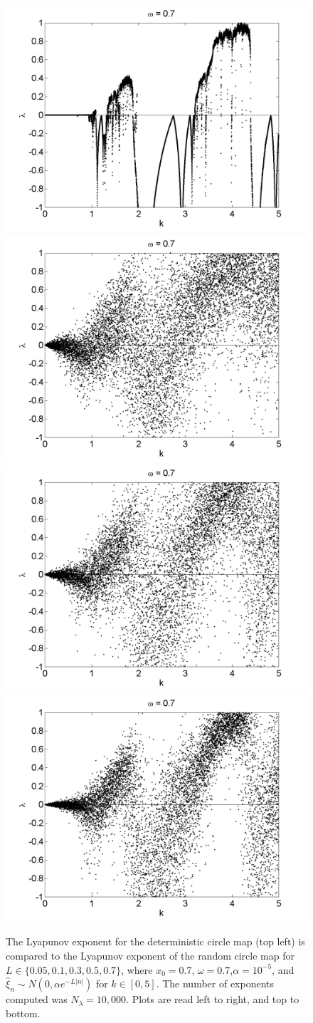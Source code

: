 \begin{figure}[!h]
\caption[Lyapunov exponent in the random circle map (normal distribution) compared to the
deterministic map, varying $k$]{The Lyapunov exponent for the deterministic
  circle map (top left) is compared
  to the Lyapunov exponent of the random circle map for $L \in
  \{0.05,0.1,0.3,0.5,0.7\}$, where $x_0=0.7$, $\omega=0.7$,$\alpha =
  10^{-5}$, and $\hat{\xi}_n\sim
  N(0,\alpha e^{-L|n|})$ for $k \in [0,5]$. The number of exponents computed was $N_\lambda=10,000$. Plots are read left to right, and top to bottom. }\label{fig:rloglyap2}
\centering
\includegraphics[width=.5\textwidth]{figs/det_circ_lyap_k.png}\hfill
\includegraphics[width=.5\textwidth]{figs/rcirc_n_lyap_L_005_k_10000.png}\\
\includegraphics[width=.5\textwidth]{figs/rcirc_n_lyap_L_01_k_10000.png}\hfill
\includegraphics[width=.5\textwidth]{figs/rcirc_n_lyap_L_03_k_10000.png}\\

\end{figure}

